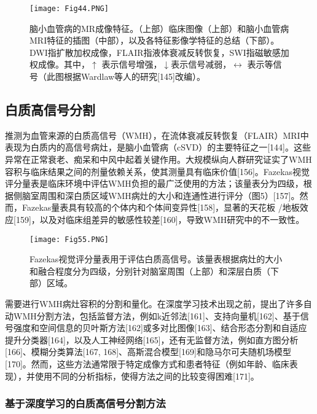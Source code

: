 \documentclass[11pt]{article}
\begin{document}
\begin{figure}[!htb]
	\centering
	\texttt{[image: Fig44.PNG]}
	\caption{\kaishu 脑小血管病的MR成像特征。（上部）临床图像（上部）和脑小血管病MRI特征的插图（中部），以及各特征影像学特征的总结（下部）。DWI指扩散加权成像，FLAIR指液体衰减反转恢复，SWI指磁敏感加权成像。其中，$\uparrow$ 表示信号增强，$\downarrow$表示信号减弱，$\leftrightarrow$ 表示等信号（此图根据Wardlaw等人的研究[145]改编）。}
	\label{Fig4}
\end{figure}

\subsection{\kaishu 白质高信号分割}

推测为血管来源的白质高信号（WMH），在流体衰减反转恢复（FLAIR）MRI中表现为白质内的高信号病灶，是脑小血管病（cSVD）的主要特征之一[144]。这些异常在正常衰老、痴呆和中风中起着关键作用。大规模纵向人群研究证实了WMH容积与临床结果之间的剂量依赖关系，使其测量具有临床价值[156]。Fazekas视觉评分量表是临床环境中评估WMH负担的最广泛使用的方法；该量表分为四级，根据侧脑室周围和深白质区域WMH病灶的大小和连通性进行评分（图5）[157]。然而，Fazekas量表具有较高的个体内和个体间变异性[158]，显著的天花板 /地板效应[159]，以及对临床组差异的敏感性较差[160]，导致WMH研究中的不一致性。

\begin{figure}[!htb]
	\centering
	\texttt{[image: Fig55.PNG]}
	\caption{\kaishu Fazekas视觉评分量表用于评估白质高信号。该量表根据病灶的大小和融合程度分为四级，分别针对脑室周围（上部）和深层白质（下部）区域。}
	\label{Fig5}
\end{figure}

需要进行WMH病灶容积的分割和量化。在深度学习技术出现之前，提出了许多自动WMH分割方法，包括监督方法，例如k近邻法[161]、支持向量机[162]、基于信号强度和空间信息的贝叶斯方法[162]或多对比图像[163]、结合形态分割和自适应提升分类器[164]，以及人工神经网络[165]，还有无监督方法，例如直方图分析[166]、模糊分类算法[167, 168]、高斯混合模型[169]和隐马尔可夫随机场模型[170]。然而，这些方法通常限于特定成像方式和患者特征（例如年龄、临床表现），并使用不同的分析指标，使得方法之间的比较变得困难[171]。

\subsubsection{\kaishu 基于深度学习的白质高信号分割方法}
\end{document}
